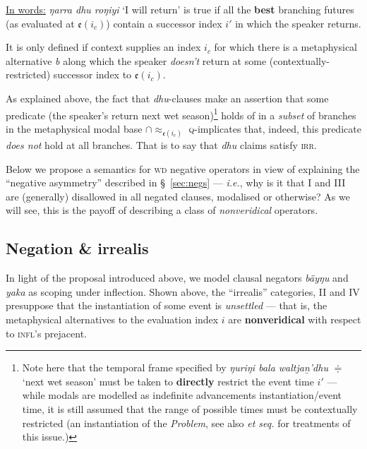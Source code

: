 \ul{In words:} \textit{ŋarra dhu roŋiyi} `I will return' is true if all the \textbf{best} branching futures (as evaluated at $\mathfrak{e}(i_c) $) contain a successor index $ i' $ in which the speaker returns.

It is only defined if context supplies an index $ i_c $ for which there is a metaphysical alternative \textit{b} along which the speaker \textit{doesn't} return at some (contex\-tually-restricted) successor index to $ \mathfrak e(i_c) $.

\xe

\noindent As explained above, the fact that \textit{dhu}-clauses make an assertion that some predicate (the speaker's return next wet season)\footnote{
	Note here that the temporal frame specified by \textit{ŋuriŋi bala waltjaṉ'dhu} $ \doteqdot $ `next wet season' must be taken to \textbf{directly} restrict the event time $ i' $ --- while modals are modelled as indefinite advancements instantiation/event time, it is still assumed that the range of possible times must be contextually restricted (an instantiation of the \textsl{\citeauthor{Partee1973}Problem}\texttrademark, see also \citet[\textit{e.g.},][]{Ogihara1996,Ogihara2007} \textit{et seq.} for treatments of this issue.)%
	}
 holds of in a \textit{subset} of branches in the metaphysical modal base $ \cap{\approx_{\mathfrak e(i_c)}} $ \textsc{q-}implicates that, indeed, this predicate \textit{does not} hold at all branches. That is to say that \textit{dhu} claims satisfy \textsc{irr}.

Below we propose a semantics for \textsc{wd} negative operators in view of explaining the ``negative asymmetry'' described in \S~\ref{sec:negs} --- \textit{i.e.}, why is it that \gls{I} and \gls{III} are (generally) disallowed in all negated clauses, modalised or otherwise? As we will see, this is the payoff of describing a class of \textit{nonveridical} operators.

\subsection{Negation \& irrealis}\label{sec:neg.irr}

In light of the proposal introduced above, we model clausal negators \textit{bäyŋu} and \textit{yaka} as scoping under inflection. Shown above, the ``irrealis'' categories, \gls{II} and \gls{IV} presuppose that the instantiation of some event is \textit{unsettled} --- that is, the metaphysical alternatives to the evaluation index $ i $ are \textbf{nonveridical} with respect to \textsc{infl}'s prejacent. 



